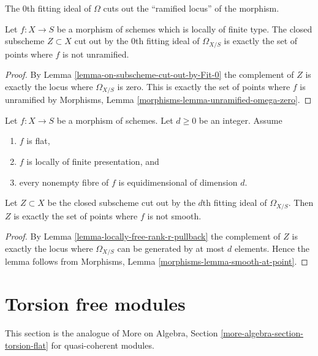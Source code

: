 \noindent
The $0$th fitting ideal of $\Omega$
cuts out the ``ramified locus'' of the morphism.

\begin{lemma}
\label{lemma-zero-fitting-ideal-omega-unramified}
Let $f : X \to S$ be a morphism of schemes which is locally of finite type.
The closed subscheme $Z \subset X$ cut out by the $0$th fitting ideal of
$\Omega_{X/S}$ is exactly the set of points where $f$ is not unramified.
\end{lemma}

\begin{proof}
By Lemma \ref{lemma-on-subscheme-cut-out-by-Fit-0} the complement of $Z$
is exactly the locus where $\Omega_{X/S}$ is zero. This is exactly
the set of points where $f$ is unramified by
Morphisms, Lemma \ref{morphisms-lemma-unramified-omega-zero}.
\end{proof}

\begin{lemma}
\label{lemma-d-fitting-ideal-omega-smooth}
Let $f : X \to S$ be a morphism of schemes. Let $d \geq 0$ be an integer.
Assume
\begin{enumerate}
\item $f$ is flat,
\item $f$ is locally of finite presentation, and
\item every nonempty fibre of $f$ is equidimensional of dimension $d$.
\end{enumerate}
Let $Z \subset X$ be the closed subscheme cut out by the $d$th fitting
ideal of $\Omega_{X/S}$. Then $Z$ is exactly the set of points
where $f$ is not smooth.
\end{lemma}

\begin{proof}
By Lemma \ref{lemma-locally-free-rank-r-pullback} the complement of $Z$
is exactly the locus where $\Omega_{X/S}$ can be generated by at most
$d$ elements. Hence the lemma follows from
Morphisms, Lemma \ref{morphisms-lemma-smooth-at-point}.
\end{proof}







\section{Torsion free modules}
\label{section-torsion-free}

\noindent
This section is the analogue of
More on Algebra, Section \ref{more-algebra-section-torsion-flat}
for quasi-coherent modules.

